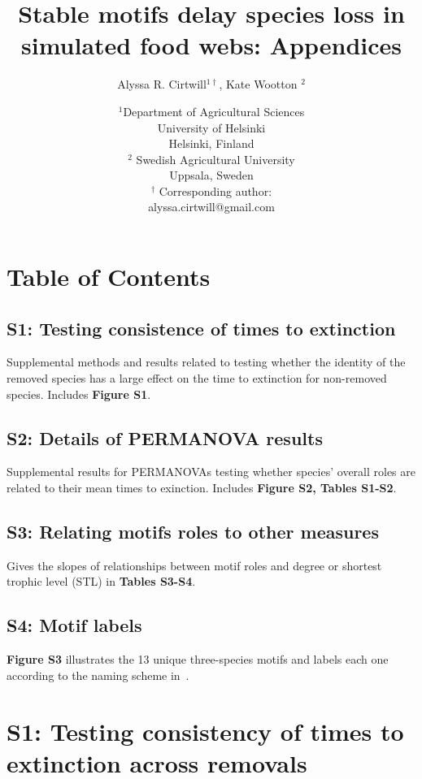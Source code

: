 \documentclass[12pt]{article}
\title{Stable motifs delay species loss in simulated food webs: Appendices}
\author{Alyssa R. Cirtwill$^{1\dagger}$, Kate Wootton $^{2}$}
\date{\small$^1$Department of Agricultural Sciences\\ 
University of Helsinki\\
Helsinki, Finland\\
\medskip
\small$^2$ Swedish Agricultural University\\
Uppsala, Sweden\\
\medskip
$^\dagger$ Corresponding author:\\
alyssa.cirtwill@gmail.com\\
 }
\begin{document}
 
\maketitle 
\raggedright
\setlength{\parindent}{15pt} 

\section*{Table of Contents}

    \subsection*{S1: Testing consistence of times to extinction}
    
        Supplemental methods and results related to testing whether the identity of the removed species has a large effect on the time to extinction for non-removed species. Includes \textbf{Figure S1}.
    
    \subsection*{S2: Details of PERMANOVA results}
        
        Supplemental results for PERMANOVAs testing whether species' overall roles are related to their mean times to exinction. Includes \textbf{Figure S2, Tables S1-S2}.
    
    \subsection*{S3: Relating motifs roles to other measures}
        
        Gives the slopes of relationships between motif roles and degree or shortest trophic level (STL) in \textbf{Tables S3-S4}.
        
    \subsection*{S4: Motif labels}
        
        \textbf{Figure S3} illustrates the 13 unique three-species motifs and labels each one according to the naming scheme in~\citet{Stouffer2007}.

\clearpage

\section*{S1: Testing consistency of times to extinction across removals}
\end{document}
